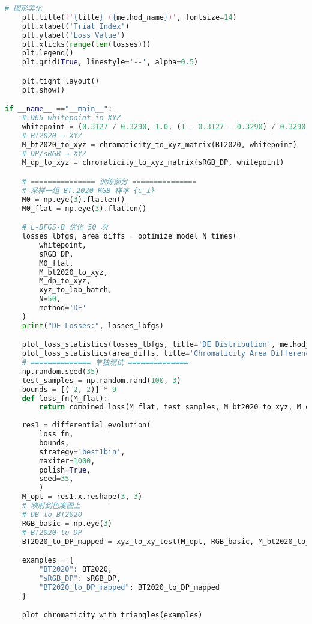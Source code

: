 \begin{lstlisting}[language=Python]
    # 图形美化
    plt.title(f'{title} ({method_name})', fontsize=14)
    plt.xlabel('Trial Index')
    plt.ylabel('Loss Value')
    plt.xticks(range(len(losses)))
    plt.legend()
    plt.grid(True, linestyle='--', alpha=0.5)

    plt.tight_layout()
    plt.show()

if __name__ =="__main__":
    # D65 whitepoint in XYZ
    whitepoint = (0.3127 / 0.3290, 1.0, (1 - 0.3127 - 0.3290) / 0.3290)
    # BT2020 → XYZ
    M_bt2020_to_xyz = chromaticity_to_xyz_matrix(BT2020, whitepoint)
    # DP/sRGB → XYZ
    M_dp_to_xyz = chromaticity_to_xyz_matrix(sRGB_DP, whitepoint)

    # =============== 训练部分 ===============
    # 采样一组 BT.2020 RGB 样本 {c_i}
    M0 = np.eye(3).flatten()
    M0_flat = np.eye(3).flatten()

    # L-BFGS-B 优化 50 次
    losses_lbfgs, area_diffs = optimize_model_N_times(
        whitepoint,
        sRGB_DP,
        M0_flat,
        M_bt2020_to_xyz,
        M_dp_to_xyz,
        xyz_to_lab_batch,
        N=50,
        method='DE'
    )
    print("DE Losses:", losses_lbfgs)

    plot_loss_statistics(losses_lbfgs, title='DE Distribution', method_name='Differential Evolution')
    plot_loss_statistics(area_diffs, title='Chromaticity Area Difference', method_name='Differential Evolution')
    # ============== 单独测试 ==============
    np.random.seed(35)
    test_samples = np.random.rand(100, 3)
    bounds = [(-2, 2)] * 9
    def loss_fn(M_flat):
        return combined_loss(M_flat, test_samples, M_bt2020_to_xyz, M_dp_to_xyz, xyz_to_lab_batch)
    
    res1 = differential_evolution(
        loss_fn,
        bounds,
        strategy='best1bin',
        maxiter=1000,
        polish=True,
        seed=35,
        )
    M_opt = res1.x.reshape(3, 3)
    # 映射到色度图上
    # DB to BT2020
    RGB_basic = np.eye(3)
    # BT2020 to DP
    BT2020_to_DP_mapped = xyz_to_xy_test(M_opt, RGB_basic, M_bt2020_to_xyz)

    examples = {
        "BT2020": BT2020,
        "sRGB_DP": sRGB_DP,
        "BT2020_to_DP_mapped": BT2020_to_DP_mapped
    }

    plot_chromaticity_with_triangles(examples)

\end{lstlisting}

